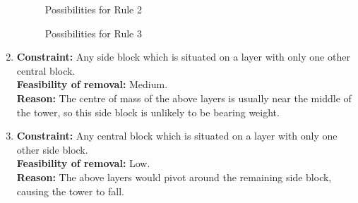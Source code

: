 \begin{enumerate}
	\begin{figure}[ht]
	\centering
	\begin{minipage}{.45\textwidth}
        \centering
        \begin{minipage}{.45\textwidth}
            \centering
        \end{minipage}
        \begin{minipage}{.45\textwidth}
            \centering
        \end{minipage}
        \caption{Possibilities for Rule 2}
    \end{minipage}
    \begin{minipage}{.45\textwidth}
        \centering
        \begin{minipage}{.45\textwidth}
            \centering
        \end{minipage}
        \begin{minipage}{.45\textwidth}
            \centering
        \end{minipage}
        \caption{Possibilities for Rule 3}
    \end{minipage}
    \end{figure}
	
	\item \textbf{Constraint:} Any side block which is situated on a layer with only one other central block.
	\\\textbf{Feasibility of removal:} Medium.
	\\\textbf{Reason:} The centre of mass of the above layers is usually near the middle of the tower, so this side block is unlikely to be bearing weight.
 	
 	\item \textbf{Constraint:} Any central block which is situated on a layer with only one other side block.
    \\\textbf{Feasibility of removal:} Low.
    \\\textbf{Reason:} The above layers would pivot around the remaining side block, causing the tower to fall.
	

\end{enumerate}
